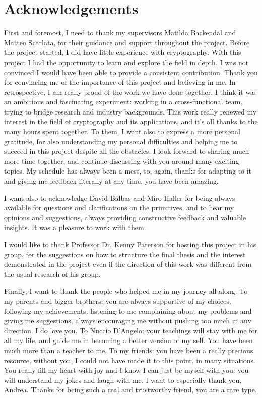 \chapter*{Acknowledgements}

First and foremost, I need to thank my supervisors Matilda Backendal and Matteo Scarlata,
for their guidance and support throughout the project.
Before the project started, I did have little experience with
cryptography. With this project I had the opportunity to
learn and explore the field in depth. 
I was not convinced I would have been able to provide
a consistent contribution. 
Thank you for convincing me of the importance of this project
and believing in me.
In retrospective, I am really
proud of the work we have done together.
I think it was an ambitious and fascinating experiment:
working in a cross-functional team, trying to bridge
research and industry backgrounds.
This work really renewed my interest in the field of 
cryptography and its applications, and it's all thanks
to the many hours spent together.
To them, I want also to express a more personal gratitude,
for also understanding my personal difficulties and
helping me to succeed in this project despite all the obstacles.
I look forward to sharing much more time together, and continue
discussing with you around many exciting topics.
My schedule has always been a mess,
so, again, thanks for adapting to it and giving me feedback literally
at any time, you have been amazing.

I want also to acknowledge David B{\'a}lbas and Miro Haller for 
being always available for questions and clarifications on the primitives,
and to hear my opinions and suggestions, always providing
constructive feedback and valuable insights. It was a pleasure
to work with them.

I would like to thank Professor Dr. Kenny Paterson
for hosting this project in his group, for the suggestions
on how to structure the final thesis and the interest
demonstrated in the project even if the direction
of this work was different from the usual research of his group.

Finally, I want to thank the people who helped me in my journey all along.
To my parents and bigger brothers: you are always supportive of my choices,
following my achievements, listening to me complaining about my problems
and giving me suggestions, 
always encouraging me without pushing too much in any direction. I do love you.
\newline
To Nuccio D'Angelo: your teachings will stay with me for all my life,
and guide me in becoming a better version of my self. 
You have been much more than a teacher to me. 
\newline
To my friends: you have been a really precious resource, without you, 
I could not have made it to this point, in many situations.
You really fill my heart with joy and I know I can just be
myself with you: you will understand my jokes and laugh with me.
I want to especially thank you, Andrea. Thanks for being such a 
real and trustworthy friend, you are a rare type.

